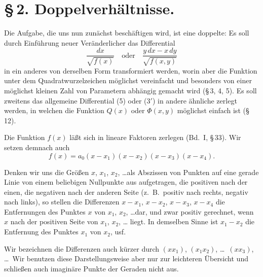 \documentclass[12pt,a4paper]{book}
\theoremstyle{definition}
\begin{document}
\section*{\S\,2. Doppelverh\"altnisse.}

Die Aufgabe, die uns nun zun\"achst besch\"aftigen wird, ist
eine doppelte: Es soll durch Einf\"uhrung neuer Ver\"anderlicher
das Differential
\begin{equation}
\frac{dx}{\sqrt{f(x)}} \quad \text{oder} \quad \frac{y\,dx - x\,dy}{\sqrt{f(x,y)}} \tag{5}
\end{equation}
in ein anderes von derselben Form transformiert werden, worin
aber die Funktion unter dem Quadratwurzelzeichen m\"oglichst
vereinfacht und besonders von einer m\"oglichst kleinen Zahl von
Parametern abh\"angig gemacht wird (\S\,3, 4, 5). Es soll zweitens
das allgemeine Differential (5) oder ($3'$) in andere \"ahnliche zerlegt
werden, in welchen die Funktion $Q(x)$ oder $\Phi(x,y)$ m\"oglichst
einfach ist (\S\,12).

Die Funktion $f(x)$ l\"a\ss t sich in lineare Faktoren zerlegen
(Bd.~I, \S\,33). Wir setzen demnach auch
\begin{equation}
f(x) = a_0(x - x_1)(x - x_2)(x - x_3)(x - x_4).
\end{equation}

Denken wir uns die Gr\"o\ss en $x$, $x_1$, $x_2$, \dots als Abszissen von
Punkten auf eine gerade Linie von einem beliebigen Nullpunkte
aus aufgetragen, die positiven nach der einen, die negativen nach
der anderen Seite (z.~B.\ positiv nach rechts, negativ nach links),
so stellen die Differenzen $x - x_1$, $x - x_2$, $x - x_3$, $x - x_4$ die
Entfernungen des Punktes $x$ von $x_1$, $x_2$, \dots dar, und zwar
positiv gerechnet, wenn $x$ nach der positiven Seite von $x_1$, $x_2$, \dots
liegt. In demselben Sinne ist $x_1 - x_2$ die Entfernung des Punktes
$x_1$ von $x_2$, usf.

Wir bezeichnen die Differenzen auch k\"urzer durch $(xx_1)$,
$(x_1 x_2)$, \dots\ $(xx_3)$, \dots\ Wir benutzen diese Darstellungsweise aber
nur zur leichteren \"Ubersicht und schlie\ss en auch imagin\"are Punkte
der Geraden nicht aus.
\end{document}
